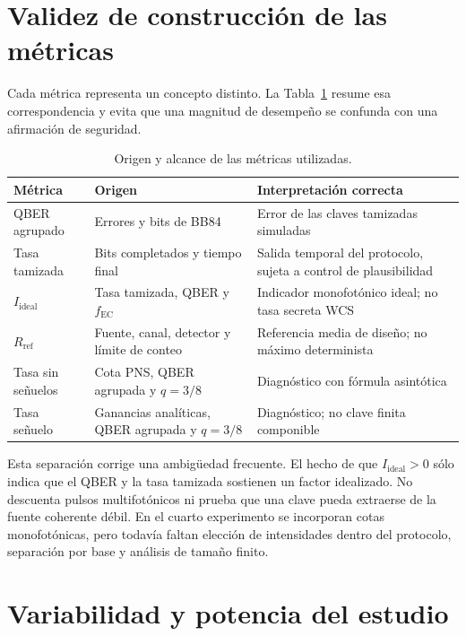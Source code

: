 \section{Validez de construcción de las métricas}

Cada métrica representa un concepto distinto. La Tabla~\ref{tab:origen_metricas} resume esa correspondencia y evita que una magnitud de desempeño se confunda con una afirmación de seguridad.

\begin{table}[htbp]
  \centering
  \begin{tabularx}{\textwidth}{p{}p{}X}
    \toprule
    Métrica & Origen & Interpretación correcta \\
    \midrule
    QBER agrupado & Errores y bits de BB84 & Error de las claves tamizadas simuladas \\
    Tasa tamizada & Bits completados y tiempo final & Salida temporal del protocolo, sujeta a control de plausibilidad \\
    \(I_\mathrm{ideal}\) & Tasa tamizada, QBER y \(f_\mathrm{EC}\) & Indicador monofotónico ideal; no tasa secreta WCS \\
    \(R_\mathrm{ref}\) & Fuente, canal, detector y límite de conteo & Referencia media de diseño; no máximo determinista \\
    Tasa sin señuelos & Cota PNS, QBER agrupada y \(q=3/8\) & Diagnóstico con fórmula asintótica \\
    Tasa señuelo & Ganancias analíticas, QBER agrupada y \(q=3/8\) & Diagnóstico; no clave finita componible \\
    \bottomrule
  \end{tabularx}
  \caption{Origen y alcance de las métricas utilizadas.}
  \label{tab:origen_metricas}
\end{table}

Esta separación corrige una ambigüedad frecuente. El hecho de que \(I_\mathrm{ideal}>0\) sólo indica que el QBER y la tasa tamizada sostienen un factor idealizado. No descuenta pulsos multifotónicos ni prueba que una clave pueda extraerse de la fuente coherente débil. En el cuarto experimento se incorporan cotas monofotónicas, pero todavía faltan elección de intensidades dentro del protocolo, separación por base y análisis de tamaño finito.

\section{Variabilidad y potencia del estudio}

